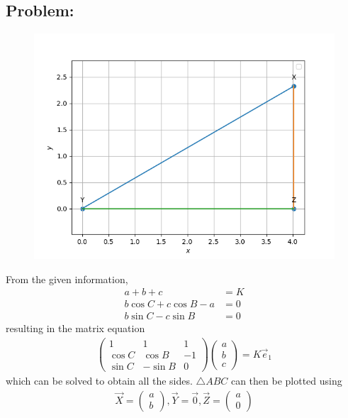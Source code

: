 \documentclass[10pt,a4paper]{report}
\newcommand{\myvec}[1]{\ensuremath{\begin{pmatrix}#1\end{pmatrix}}}
\begin{document}
\begin{multicols}{2}

\section{Problem:}  
	\begin{figure}[!h]
		\centering
 \includegraphics[width=\columnwidth]{chapters/9/11/2/4/figs/line.png}
		\caption{}
		\label{eq:cons/tri/9/11/2/4}
  	\end{figure}
\fi
	From the given information, 
\begin{align}
	a+b+c &= K
	\\
	b\cos C + c \cos B -a &=0
	\\
	b\sin C - c \sin B &=0
\end{align}
resulting in the matrix equation
\begin{align}
	\myvec{
		1 & 1 & 1 
	\\
	\cos C &  \cos B &-1
	\\
	\sin C &-  \sin B & 0
}\myvec{a \\ b \\ c}
= K \vec{e}_1
\end{align}
which can be solved to obtain all the sides.  
\iffalse
	$\triangle ABC$ can then be plotted using
\begin{align}
	\vec{X} = \myvec{a \\ b},
	\vec{Y} = \vec{0},
	\vec{Z} =\myvec{a \\ 0}
\end{align}


\end{multicols}
\end{document}
